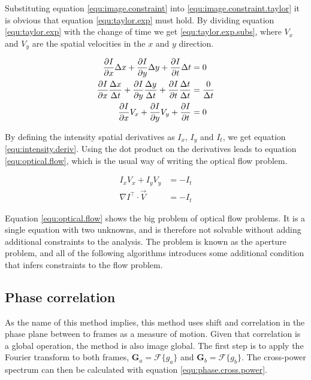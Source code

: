 Substituting equation \eqref{equ:image.constraint} into \eqref{equ:image.constraint.taylor} it is obvious that equation \eqref{equ:taylor.exp} must hold. 
By dividing equation \eqref{equ:taylor.exp} with the change of time we get \eqref{equ:taylor.exp.subs}, where $V_x$ and $V_y$ are the spatial velocities in the 
$x$ and $y$ direction.

\begin{align}
	\frac{\partial I}{\partial x} \Delta x + \frac{\partial I}{\partial y} \Delta y + 
		\frac{\partial I}{\partial t} \Delta t &= 0 \label{equ:taylor.exp} \\
	\frac{\partial I}{\partial x} \frac{\Delta x}{\Delta t} + \frac{\partial I}{\partial y} \frac{\Delta y}{\Delta t} + 
		\frac{\partial I}{\partial t} \frac{\Delta t}{\Delta t} &= \frac{0}{\Delta t} \notag \\
	\frac{\partial I}{\partial x} V_x + \frac{\partial I}{\partial y} V_y + \frac{\partial I}{\partial t}  &= 0 \label{equ:taylor.exp.subs}
\end{align}

By defining the intensity spatial derivatives as $I_x$, $I_y$ and $I_t$, we get equation \eqref{equ:intensity.deriv}. Using the dot product on the derivatives 
leads to equation \eqref{equ:optical.flow}, which is the usual way of writing the optical flow problem.

\begin{align}
	I_x V_x + I_y V_y &= -I_t \label{equ:intensity.deriv} \\
	\nabla I^\top \cdot \vec{V} &= -I_t \label{equ:optical.flow}
\end{align}

Equation \eqref{equ:optical.flow} shows the big problem of optical flow problems. It is a single equation with two unknowns, and is therefore not 
solvable without adding additional constraints to the analysis. The problem is known as the aperture problem, and all of the following algorithms 
introduces some additional condition that infers constraints to the flow problem.

\subsection{Phase correlation}\label{sec:phase.correlation}
As the name of this method implies, this method uses shift and correlation in the phase plane between to frames as a measure of motion. Given that correlation is a global operation,
the method is also image global. The first step is to apply the Fourier transform to both frames, $\textbf{G}_a = \mathcal{F}\{g_a\}$ and $\textbf{G}_b = \mathcal{F}\{g_b\}$. The cross-power spectrum 
can then be calculated with equation \eqref{equ:phase.cross.power}.

